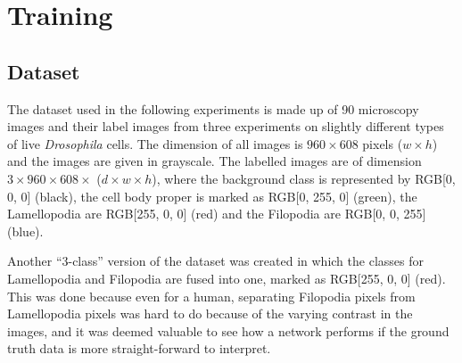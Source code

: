 \chapter{Training}
\label{chap:training}

	\section{Dataset}
The dataset used in the following experiments is made up of 90 microscopy images and their label images from three experiments on slightly different types of live \textit{Drosophila} cells. The dimension of all images is $960 \times 608$ pixels ($w \times h$) and the images are given in grayscale. The labelled images are of dimension $3 \times 960 \times 608 \times$ ($d \times w \times h$), where the background class is represented by RGB[0, 0, 0] (black), the cell body proper is marked as RGB[0, 255, 0] (green), the Lamellopodia are RGB[255, 0, 0] (red) and the Filopodia are RGB[0, 0, 255] (blue).

Another ``3-class'' version of the dataset was created in which the classes for Lamellopodia and Filopodia are fused into one, marked as RGB[255, 0, 0] (red). This was done because even for a human, separating Filopodia pixels from Lamellopodia pixels was hard to do because of the varying contrast in the images, and it was deemed valuable to see how a network performs if the ground truth data is more straight-forward to interpret.\\

